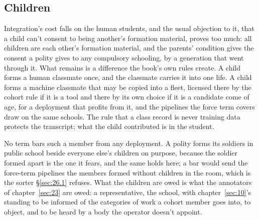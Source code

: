 \subsection{Children}
\label{sec:26.10.1}
Integration's cost falls on the human students, and the usual objection to it, that a child can't consent to being another's formation material, proves too much: all children are each other's formation material, and the parents' condition gives the consent a polity gives to any compulsory schooling, by a generation that went through it. What remains is a difference the book's own rules create. A child forms a human classmate once, and the classmate carries it into one life. A child forms a machine classmate that may be copied into a fleet, licensed there by the cohort rule if it is a tool and there by its own choice if it is a candidate come of age, for a deployment that profits from it, and the pipelines the force term covers draw on the same schools. The rule that a class record is never training data protects the transcript; what the child contributed is in the student.

No term bars such a member from any deployment. A polity forms its soldiers in public school beside everyone else's children on purpose, because the soldier formed apart is the one it fears, and the same holds here; a bar would send the force-term pipelines the members formed without children in the room, which is the sorter \S\ref{sec:26.1} refuses. What the children are owed is what the annotators of chapter~\ref{sec:23} are owed: a representative, the school, with chapter~\ref{sec:10}'s standing to be informed of the categories of work a cohort member goes into, to object, and to be heard by a body the operator doesn't appoint.
